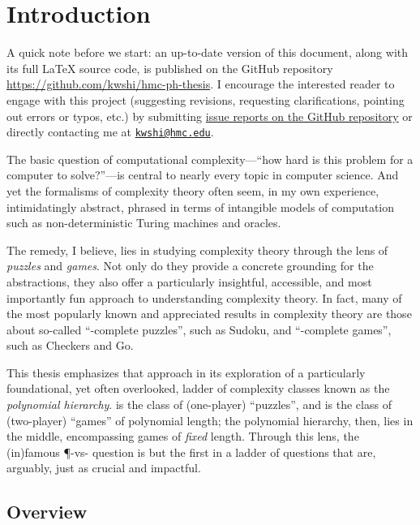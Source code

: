 \chapter{Introduction}

A quick note before we start: an up-to-date version of this document, along with
its full \LaTeX{} source code, is published on the GitHub repository
\url{https://github.com/kwshi/hmc-ph-thesis}.  I encourage the interested reader
to engage with this project (suggesting revisions, requesting clarifications,
pointing out errors or typos, etc.) by submitting
\href{https://github.com/kwshi/hmc-ph-thesis/issues}{issue reports on the GitHub
repository} or directly contacting me at
\href{mailto:kwshi@hmc.edu}{\texttt{kwshi@hmc.edu}}.

The basic question of computational complexity---``how hard is this problem for
a computer to solve?''---is central to nearly every topic in computer science.
And yet the formalisms of complexity theory often seem, in my own experience,
intimidatingly abstract, phrased in terms of intangible models of computation
such as non-deterministic Turing machines and oracles.

The remedy, I believe, lies in studying complexity theory through the lens of
\emph{puzzles} and \emph{games}.  Not only do they provide a concrete grounding
for the abstractions, they also offer a particularly insightful, accessible,
and most importantly fun approach to understanding complexity theory.  In fact,
many of the most popularly known and appreciated results in complexity theory
are those about so-called ``\NP-complete puzzles'', such as Sudoku, and
``\PSPACE-complete games'', such as Checkers and Go.

This thesis emphasizes that approach in its exploration of a particularly
foundational, yet often overlooked, ladder of complexity classes known as the
\emph{polynomial hierarchy}.  \NP{} is the class of (one-player) ``puzzles'',
and \PSPACE{} is the class of (two-player) ``games'' of polynomial length; the
polynomial hierarchy, then, lies in the middle, encompassing games of
\emph{fixed} length.  Through this lens, the (in)famous \P-vs-\NP{} question is
but the first in a ladder of questions that are, arguably, just as crucial and
impactful.


\section{Overview}


